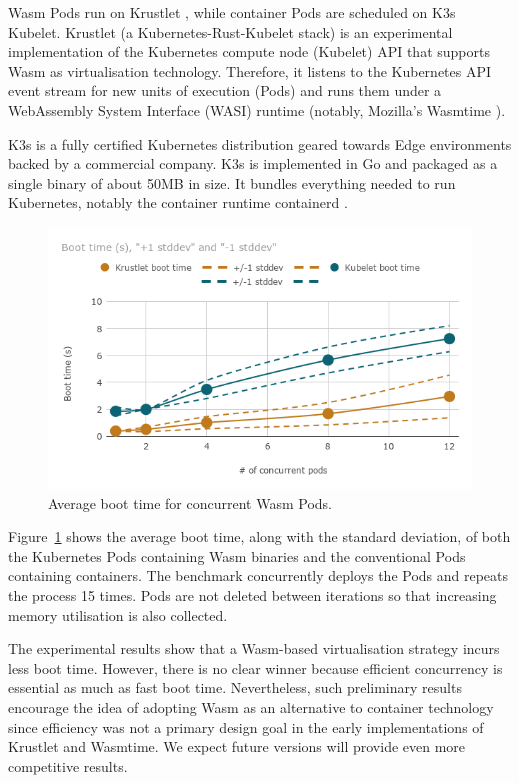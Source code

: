 Wasm Pods run on Krustlet \cite{krustlet}, while container Pods are scheduled on K3s \cite{k3s} Kubelet. Krustlet (a Kubernetes-Rust-Kubelet stack) is an experimental implementation of the Kubernetes compute node (Kubelet) API that supports Wasm as virtualisation technology. Therefore, it listens to the Kubernetes API event stream for new units of execution (Pods) and runs them under a WebAssembly System Interface (WASI) runtime (notably, Mozilla's Wasmtime \cite{wasmtime}).

K3s is a fully certified Kubernetes distribution geared towards Edge environments backed by a commercial company. K3s is implemented in Go and packaged as a single binary of about 50MB in size. It bundles everything needed to run Kubernetes, notably the container runtime containerd \cite{containerd}.

\begin{figure}[ht]
\centering
\includegraphics[width=\columnwidth]{figures/b-krustlet-1}
\caption{Average boot time for concurrent Wasm Pods.}
\label{fig:b-krustlet-1}
\end{figure}

Figure~\ref{fig:b-krustlet-1} shows the average boot time, along with the standard deviation, of both the Kubernetes Pods containing Wasm binaries and the conventional Pods containing containers. The benchmark concurrently deploys the Pods and repeats the process 15 times. Pods are not deleted between iterations so that increasing memory utilisation is also collected.

The experimental results show that a Wasm-based virtualisation strategy incurs less boot time. However, there is no clear winner because efficient concurrency is essential as much as fast boot time. Nevertheless, such preliminary results encourage the idea of adopting Wasm as an alternative to container technology since efficiency was not a primary design goal in the early implementations of Krustlet and Wasmtime. We expect future versions will provide even more competitive results.

